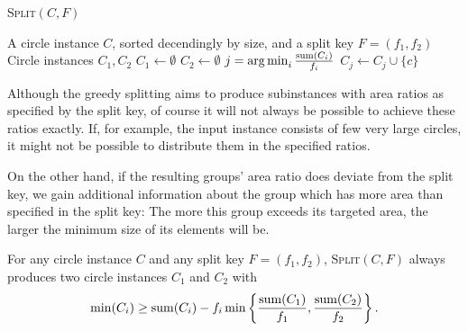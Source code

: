 \documentclass[a4paper,style=print,oneside,bibliography=totoc,nexus,lnum,extramargin]{tubsbook}
\begin{document}
\begin{algorithm}
    \caption{\textsc{Split}$(C,F)$}
    \label{alg:split}
    \begin{algorithmic}
        \Require A circle instance $C$, sorted decendingly by size, and a split key $F = (f_1, f_2)$
        \Ensure Circle instances $C_1, C_2$
        \State $C_1 \gets \emptyset$
        \State $C_2 \gets \emptyset$
            \State $j = \operatorname*{arg\,min}_{i} \frac{\operatorname{sum}(C_i)}{f_i}$
            \State $C_j \gets C_j \cup \{c\}$
        \EndFor
    \end{algorithmic}
\end{algorithm}

Although the greedy splitting aims to produce subinstances with area ratios as specified by the split key, of course it will not always be possible to achieve these ratios exactly. If, for example, the input instance consists of few very large circles, it might not be possible to distribute them in the specified ratios.

On the other hand, if the resulting groups' area ratio does deviate from the split key, we gain additional information about the group which has more area than specified in the split key: The more this group exceeds its targeted area, the larger the minimum size of its elements will be.

\begin{lemma}\label{th:min1}

    For any circle instance $C$ and any split key $F = (f_1, f_2)$, \textsc{Split}$(C,F)$ always produces two circle instances $C_1$ and $C_2$ with
    $$\min(C_i) \ge \operatorname{sum}(C_i) - f_i\min\left\{\frac{\operatorname{sum}(C_1)}{f_1},\frac{\operatorname{sum}(C_2)}{f_2}\right\}.$$


\end{lemma}
\end{document}
